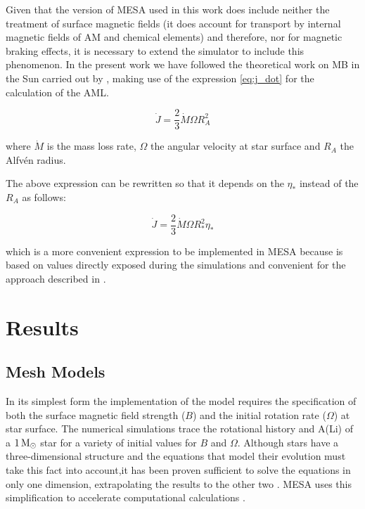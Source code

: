 \documentclass[fleqn,usenatbib]{mnras}
\begin{document}
Given that the version of MESA used in this work does include neither the treatment of surface magnetic fields (it does account for transport by internal magnetic fields of AM and chemical elements) and therefore, nor for magnetic braking effects, it is necessary to extend the simulator to include this phenomenon. In the present work we have followed the theoretical work on MB in the Sun carried out by \citet{Weber1967}, making use of the expression \ref{eq:j_dot} for the calculation of the AML.
\begin{ceqn}
\begin{equation}
 \Dot{J} = \frac{2}{3} \Dot{M}\Omega R^{2}_{A} \label{eq:j_dot}
\end{equation}
\end{ceqn}
where $\Dot{M}$ is the mass loss rate, $\Omega$ the angular velocity at star surface and $R_A$ the Alfv\'{e}n radius. \par

The above expression can be rewritten so that it depends on the $\eta_*$ instead of the $R_A$ as follows:
\begin{ceqn}
\begin{equation}
 \Dot{J} = \frac{2}{3} \Dot{M}\Omega R^{2}_{*}\eta_* \label{eq:j_dot_mesa}
\end{equation}
\end{ceqn}
which is a more convenient expression to be implemented in MESA because is based on values directly exposed during the simulations and convenient for the approach described in \citet{Ud-Doula2007}.

\section{Results} \label{sec_3}

\subsection{Mesh Models} \label{sec_mesh}

In its simplest form the implementation of the model requires the specification of both the surface magnetic field strength ($B$) and the initial rotation rate ($\Omega$) at star surface. The numerical simulations trace the rotational history and A(Li) of a $1\, \mathrm{M}_\odot$ star for a variety of initial values for $B$ and $\Omega$. Although stars have a three-dimensional structure and the equations that model their evolution must take this fact into account,it has been proven sufficient to solve the equations in only one dimension, extrapolating the results to the other two \citep[shellular approximation,][]{Meynet1997}. MESA uses this simplification to accelerate computational calculations \citet{Paxton2013}.\par
\end{document}
